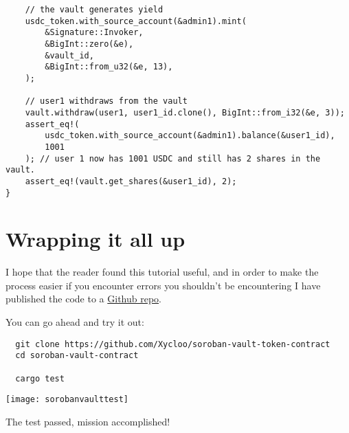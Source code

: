 \documentclass{article}
\begin{document}
\begin{lstlisting}
    // the vault generates yield
    usdc_token.with_source_account(&admin1).mint(
        &Signature::Invoker,
        &BigInt::zero(&e),
        &vault_id,
        &BigInt::from_u32(&e, 13),
    );

    // user1 withdraws from the vault
    vault.withdraw(user1, user1_id.clone(), BigInt::from_i32(&e, 3));
    assert_eq!(
        usdc_token.with_source_account(&admin1).balance(&user1_id),
        1001
    ); // user 1 now has 1001 USDC and still has 2 shares in the vault.
    assert_eq!(vault.get_shares(&user1_id), 2);
}

\end{lstlisting}

\section{Wrapping it all up}
I hope that the reader found this tutorial useful, and in order to make the process easier if you encounter errors you shouldn't be encountering I have published the code to a \href{https://github.com/Xycloo/soroban-vault-contract}{Github repo}.

You can go ahead and try it out:

\begin{lstlisting}
  git clone https://github.com/Xycloo/soroban-vault-token-contract
  cd soroban-vault-contract

  cargo test
\end{lstlisting}

\texttt{[image: sorobanvaulttest]}

The test passed, mission accomplished!
\end{document}
